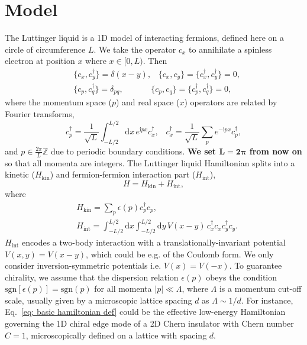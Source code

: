\documentclass[aps,prx,10pt,twocolumn,amsmath,amssymb,superscriptaddress]{revtex4-2}
\newcommand{\cdag}{c^{\dag}}
\newcommand{\sgn}{\text{sgn}}
\theoremstyle{definition}
\theoremstyle{definition}
\newcommand{\bs}[1]{\boldsymbol{#1}}
\begin{document}
\section{Model} \label{sec:background}
The Luttinger liquid is a 1D model of interacting fermions, defined here on a circle of circumference $L$. We take the operator $c_{x}$ to annihilate a spinless electron at position $x$ where $x \in [0, L)$. Then
\begin{equation}
   \begin{aligned}
   &\{c_x, \cdag_y\} = \delta(x-y), \;\;\; \{c_x, c_y\} = \{\cdag_x, \cdag_y\} = 0, \\
   &\{c_p, \cdag_q\} = \delta_{pq}, \;\;\;\;\;\;\;\;\;\;\;\; \{c_p, c_q\} = \{\cdag_p, \cdag_q\} = 0,
   \end{aligned}
\end{equation}
where the momentum space ($p$) and real space ($x$) operators are related by Fourier transforms,
\begin{equation}
\cdag_p = \frac{1}{\sqrt{L}}\int_{-L/2}^{L/2} \mathrm{d} x \, e^{\mathrm{i} px}\cdag_x, \;\;\; \cdag_x = \frac{1}{\sqrt{L}}\sum_p e^{-\mathrm{i} px}\cdag_p,
\end{equation}
and $p \in \frac{2\pi}{L}\mathbb{Z}$ due to periodic boundary conditions. \textbf{We set $\bs{L = 2\pi}$ from now on} so that all momenta are integers.
The Luttinger liquid Hamiltonian splits into a kinetic ($H_{\mathrm{kin}}$) and fermion-fermion interaction part ($H_{\mathrm{int}}$),
\begin{equation} \label{eq: basic hamiltonian def}
H = H_{\mathrm{kin}} + H_{\mathrm{int}},
\end{equation}
where
\begin{equation}
   \begin{aligned}
& H_{\mathrm{kin}} = \sum_{p}\epsilon(p)\cdag_pc_p, \\
& H_{\mathrm{int}} = \int_{-L/2}^{L/2} \mathrm{d} x\int_{-L/2}^{L/2} \mathrm{d} y \, V(x-y) \, \cdag_xc_x\cdag_yc_y.
   \end{aligned}
\end{equation}
$H_{\mathrm{int}}$ encodes a two-body interaction with a translationally-invariant potential $V(x, y) = V(x-y)$, which could be e.g. of the Coulomb form. We only consider inversion-symmetric potentials i.e. $V(x) = V(-x)$. To guarantee chirality, we assume that the dispersion relation $\epsilon(p)$ obeys the condition $\sgn[\epsilon(p)] = \sgn(p)$ for all momenta $|p| \ll \Lambda$, where $\Lambda$ is a momentum cut-off scale, usually given by a microscopic lattice spacing $d$ as $\Lambda \sim 1/d$. For instance, Eq.~\eqref{eq: basic hamiltonian def} could be the effective low-energy Hamiltonian governing the 1D chiral edge mode of a 2D Chern insulator with Chern number $C = 1$, microscopically defined on a lattice with spacing $d$.
\end{document}
